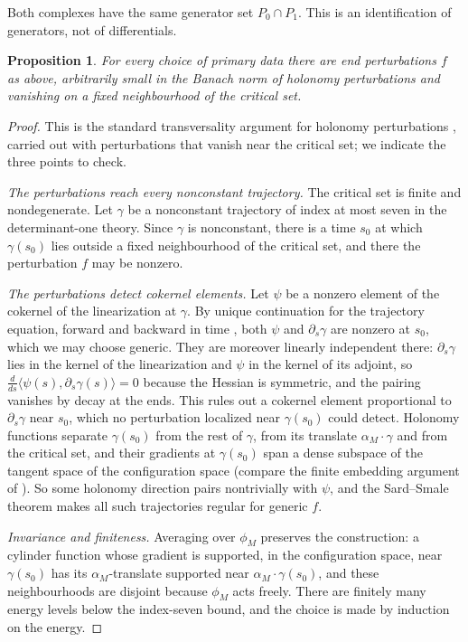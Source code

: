 \documentclass[11pt]{amsart}
\newtheorem{proposition}[theorem]{Proposition}
\theoremstyle{definition}
\theoremstyle{remark}
\theoremstyle{plain}
\numberwithin{equation}{section}
\begin{document}
Both complexes have the same generator set $P_0\cap P_1$. This is an
identification of generators, not of differentials.

\begin{proposition}\label{prop:input-functions}
For every choice of primary data there are end perturbations $f$ as above,
arbitrarily small in the Banach norm of holonomy perturbations
\cite[Section~5.5]{Donaldson-book} and vanishing on a fixed neighbourhood of the
critical set.
\end{proposition}

\begin{proof}
This is the standard transversality argument for holonomy perturbations
\cite[Section~5.5]{Donaldson-book}, carried out with perturbations that vanish
near the critical set; we indicate the three points to check.

\emph{The perturbations reach every nonconstant trajectory.} The critical set is
finite and nondegenerate. Let $\gamma$ be a nonconstant trajectory of index at most seven in the determinant-one theory. Since $\gamma$ is nonconstant, there is a time
$s_0$ at which $\gamma(s_0)$ lies outside a fixed neighbourhood of the critical
set, and there the perturbation $f$ may be nonzero.

\emph{The perturbations detect cokernel elements.} Let $\psi$ be a nonzero element
of the cokernel of the linearization at $\gamma$. By unique continuation for the
trajectory equation, forward and backward in time
\cite[Proposition~8.6 and Theorem~C.1]{SW-lagrangian}, both $\psi$ and
$\partial_s\gamma$ are nonzero at $s_0$, which we may choose generic. They are
moreover linearly independent there: $\partial_s\gamma$ lies in the kernel of the
linearization and $\psi$ in the kernel of its adjoint, so
$\frac{d}{ds}\langle\psi(s),\partial_s\gamma(s)\rangle=0$ because the Hessian is
symmetric, and the pairing vanishes by decay at the ends. This rules out a
cokernel element proportional to $\partial_s\gamma$ near $s_0$, which no
perturbation localized near $\gamma(s_0)$ could detect. Holonomy
functions separate $\gamma(s_0)$ from the rest of $\gamma$, from its translate
$\alpha_M\cdot\gamma$ and from the critical set, and their gradients at $\gamma(s_0)$
span a dense subspace of the tangent space of the configuration space (compare
the finite embedding argument of \cite[Section~5.5, Lemma~5.16]{Donaldson-book}).
So some holonomy direction pairs nontrivially with $\psi$, and the Sard--Smale
theorem makes all such trajectories regular for generic $f$.

\emph{Invariance and finiteness.} Averaging over $\phi_M$ preserves the
construction: a cylinder function whose gradient is supported, in the configuration
space, near $\gamma(s_0)$ has its $\alpha_M$-translate supported near $\alpha_M\cdot\gamma(s_0)$,
and these neighbourhoods are disjoint because $\phi_M$ acts freely. There are finitely many energy levels below the
index-seven bound, and the choice is made by induction on the energy.
\end{proof}
\end{document}

